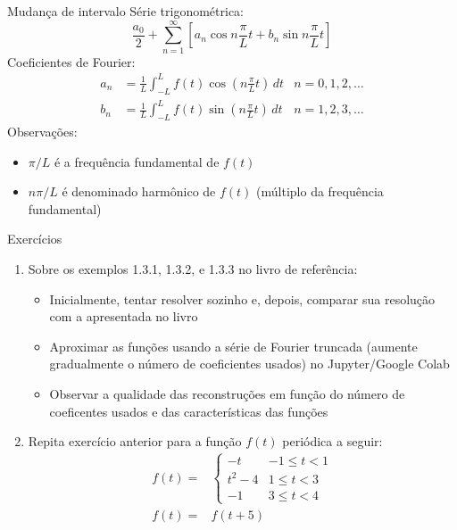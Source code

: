       \begin{slide}[toc=]{Mudança de intervalo}
	      Série trigonométrica:
	      \begin{equation*}
		      \frac{a_0}{2}+ \sum_{n=1}^\infty \left [ a_n\cos n\frac{\pi}{L}t  + b_n\sin n\frac{\pi}{L}t \right ]
	      \end{equation*}
	      Coeficientes de Fourier:
	      \begin{align*}
		      a_n &= \frac{1}{L}\int_{-L}^L f(t)\cos \left(n\frac{\pi}{L}t\right)\, dt & n=0,1,2,\dots\\
		      b_n &= \frac{1}{L}\int_{-L}^L f(t)\sin \left(n\frac{\pi}{L}t\right)\, dt & n=1,2,3,\dots
	      \end{align*}
	      Observações:
	      \begin{itemize}
		      \item $\pi/L$ é a frequência fundamental de $f(t)$
		      \item $n\pi/L$ é denominado harmônico de $f(t)$ (múltiplo da frequência fundamental)
	      \end{itemize}
      \end{slide}

      \begin{slide}[toc=]{Exercícios}
	      \begin{enumerate}
		      \item Sobre os exemplos 1.3.1, 1.3.2, e 1.3.3 no livro de referência: 
	      		\begin{itemize}
		      		\item Inicialmente, tentar resolver sozinho e, depois, comparar sua resolução com a apresentada no livro
		      		\item Aproximar as funções usando a série de Fourier truncada (aumente gradualmente o número de coeficientes usados) no Jupyter/Google Colab
		      		\item Observar a qualidade das reconstruções em função do número de coeficentes usados e das características das funções
	      		\end{itemize}
	      	   \item Repita exercício anterior para a função $f(t)$ periódica a seguir:
	      		\begin{align*}
		     		f(t)  =& \begin{cases}
			      		-t     & -1\leq t < 1\\
			      		t^2-4  &  1\leq t < 3\\
			      		-1     &  3\leq t < 4
		      		\end{cases}\\
		      		f(t) =& f(t+5)
	      		\end{align*}
	      \end{enumerate}
      \end{slide}

